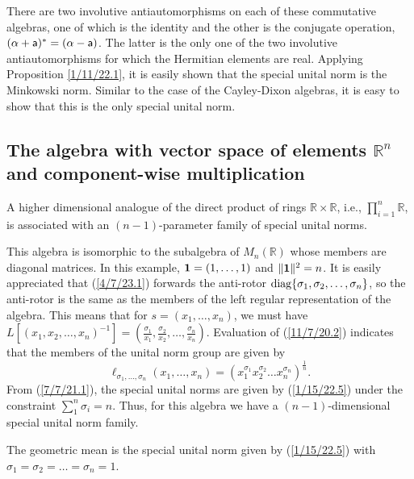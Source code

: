 \documentclass{amsart}
\numberwithin{equation}{section}
\theoremstyle{definition}
\numberwithin{theorem}{section}
\begin{document}
 There are two involutive antiautomorphisms on each of these commutative algebras, one of which is the identity and the other is the conjugate operation, $(\alpha+ {\sf a})^* = (\alpha- {\sf a})$. The latter is the only one of the two involutive antiautomorphisms  for which the Hermitian elements are real.  Applying Proposition \ref{1/11/22.1}, it is easily shown that the special unital norm is the Minkowski norm.  Similar to the case of the Cayley-Dixon algebras, it is easy to show that this is the only special unital norm.

 
 \subsection{The algebra with vector space of elements $\mathbb{R}^n$ and component-wise multiplication} A higher dimensional analogue of the direct product of rings \mbox{$\mathbb{R}\times \mathbb{R}$}, i.e., $\prod_{i=1}^n \mathbb{R}$, is associated with an $(n-1)$-parameter family of  special unital norms.

 This algebra is isomorphic to the subalgebra of $ M_n(\mathbb{R})$  whose members are diagonal matrices. In this example, ${\bf 1} = (1,\dots,1)$ and $\|{\bf 1}\|^2 = n$.   It is easily appreciated that (\ref{4/7/23.1}) forwards the anti-rotor ${\rm diag} \{ \sigma_1, \sigma_2,\dots,\sigma_n\}$, so the anti-rotor is the same as the members of the left regular representation of the algebra.  This means that for $s=(x_1,\dots,x_n)$, we must have $L[(x_1,x_2,\dots,x_n)^{-1}] = (\frac{\sigma_1}{x_1}, \frac{\sigma_2}{x_2},\dots,\frac{\sigma_n}{x_n})$.     Evaluation of (\ref{11/7/20.2}) indicates that the members of the unital norm group are given by  \begin{equation}\label{1/15/22.5} \ell_{\sigma_1,\dots,\sigma_n}(x_1,\dots,x_n) = (x_1^{\sigma_1} x_2^{\sigma_2} \dots x_n^{\sigma_n})^\frac{1}{n}. \end{equation} From (\ref{7/7/21.1}), the special unital norms are given by (\ref{1/15/22.5}) under the constraint $\sum_1^n \sigma_i = n$. Thus, for this algebra we have a $(n-1)$-dimensional special unital norm family.   
 
 The geometric mean is the special unital norm given by (\ref{1/15/22.5}) with $\sigma_1=\sigma_2=\dots =\sigma_n = 1$.  
   
\end{document}

